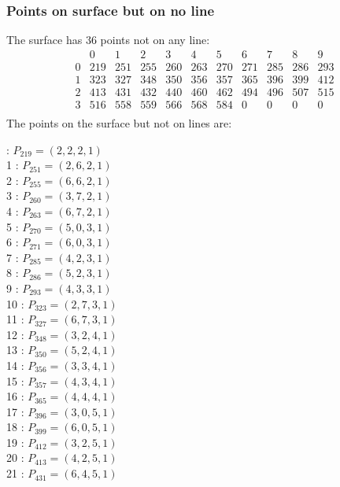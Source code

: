 \documentclass{article}
\begin{document}
{\subsubsection*{Points on surface but on no line}
The surface has 36 points not on any line:\\
$$
\begin{array}{r|*{10}{r}}
 & 0 & 1 & 2 & 3 & 4 & 5 & 6 & 7 & 8 & 9\\
\hline
0 & 219 & 251 & 255 & 260 & 263 & 270 & 271 & 285 & 286 & 293\\
1 & 323 & 327 & 348 & 350 & 356 & 357 & 365 & 396 & 399 & 412\\
2 & 413 & 431 & 432 & 440 & 460 & 462 & 494 & 496 & 507 & 515\\
3 & 516 & 558 & 559 & 566 & 568 & 584 & 0 & 0 & 0 & 0\\
\end{array}
$$
The points on the surface but not on lines are:\\
\begin{multicols}{2}
 : $P_{219}=( 2, 2, 2, 1 )$\\
1 : $P_{251}=( 2, 6, 2, 1 )$\\
2 : $P_{255}=( 6, 6, 2, 1 )$\\
3 : $P_{260}=( 3, 7, 2, 1 )$\\
4 : $P_{263}=( 6, 7, 2, 1 )$\\
5 : $P_{270}=( 5, 0, 3, 1 )$\\
6 : $P_{271}=( 6, 0, 3, 1 )$\\
7 : $P_{285}=( 4, 2, 3, 1 )$\\
8 : $P_{286}=( 5, 2, 3, 1 )$\\
9 : $P_{293}=( 4, 3, 3, 1 )$\\
10 : $P_{323}=( 2, 7, 3, 1 )$\\
11 : $P_{327}=( 6, 7, 3, 1 )$\\
12 : $P_{348}=( 3, 2, 4, 1 )$\\
13 : $P_{350}=( 5, 2, 4, 1 )$\\
14 : $P_{356}=( 3, 3, 4, 1 )$\\
15 : $P_{357}=( 4, 3, 4, 1 )$\\
16 : $P_{365}=( 4, 4, 4, 1 )$\\
17 : $P_{396}=( 3, 0, 5, 1 )$\\
18 : $P_{399}=( 6, 0, 5, 1 )$\\
19 : $P_{412}=( 3, 2, 5, 1 )$\\
20 : $P_{413}=( 4, 2, 5, 1 )$\\
21 : $P_{431}=( 6, 4, 5, 1 )$\\

\end{multicols}}
\end{document}
